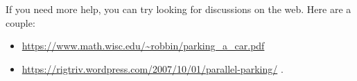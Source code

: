 \documentclass[12pt]{article}
\numberwithin{equation}{section}    %
\begin{document}
If you need more help, you can try looking for discussions on the web. Here are a couple:
\begin{itemize}
	\item \url{https://www.math.wisc.edu/~robbin/parking_a_car.pdf}
	\item \url{https://rigtriv.wordpress.com/2007/10/01/parallel-parking/} .
\end{itemize}






%
\end{document}
